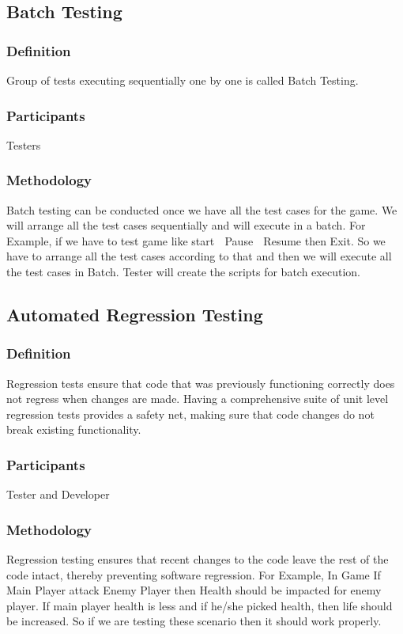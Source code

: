 \documentclass{article}
\begin{document}
\subsection{Batch Testing}
\subsubsection{Definition}
Group of tests executing sequentially one by one is called Batch Testing.\cite{BT}
\subsubsection{Participants}
Testers 
\subsubsection{Methodology}
Batch testing can be conducted once we have all the test cases for the game. We will arrange all the test cases sequentially and will execute in a batch. For Example, if we have to test game like start  Pause  Resume then Exit. So we have to arrange all the test cases according to that and then we will execute all the test cases in Batch. Tester will create the scripts for batch execution.\cite{BT}

\subsection{Automated Regression Testing }
\subsubsection{Definition}
Regression tests ensure that code that was previously functioning correctly does not regress when changes are made. Having a comprehensive suite of unit level regression tests provides a safety net, making sure that code changes do not break existing functionality.\cite{RT} 
\subsubsection{Participants}
Tester and Developer
\subsubsection{Methodology}
Regression testing ensures that recent changes to the code leave the rest of the code intact, thereby preventing software regression. For Example, In Game If Main Player attack Enemy Player then Health should be impacted for enemy player. If main player health is less and if he/she picked health, then life should be increased. So if we are testing these scenario then it should work properly.\cite{RT}
\end{document}
